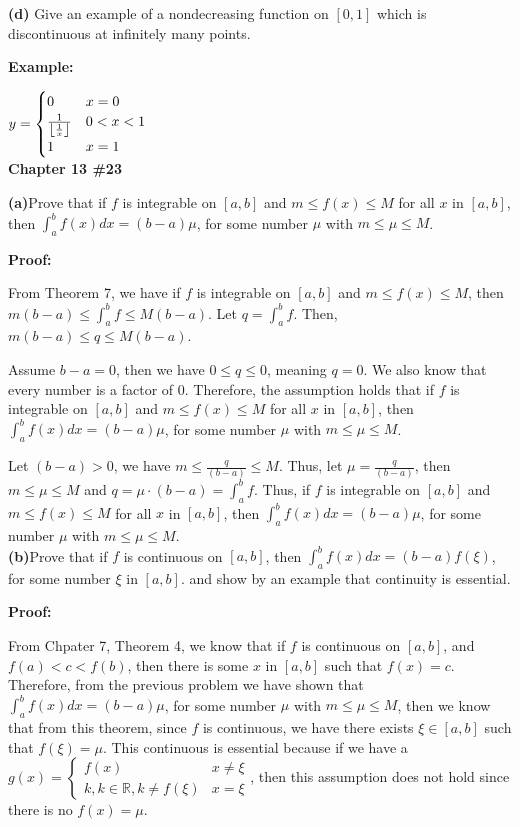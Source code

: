 \documentclass[a4paper,12pt]{report}
\DeclarePairedDelimiter\floor{\lfloor}{\rfloor}
\begin{document}
\noindent
\textbf{(d)} Give an example of a nondecreasing function on $[0,1]$ which is discontinuous at infinitely many points. 

\noindent
\textbf{Example: }

 $y =
    \begin{cases}
      0 & x=0\\
      \frac{1}{\floor*{\frac{1}{x}}} & 0<x<1\\
      1 & x=1
    \end{cases}  $\\
    
\noindent
\textbf{Chapter 13 \#23}

\noindent
\textbf{(a)}Prove that if $f$ is integrable on $[a,b]$ and $m\leq f(x)\leq M$ for all $x$ in $[a,b]$, then $\int_a^bf(x)dx=(b-a)\mu$, for some number $\mu$ with $m\leq \mu\leq M$.

\noindent
\textbf{Proof:}

\noindent
From Theorem 7, we have if $f$ is integrable on $[a,b]$ and $m\leq f(x)\leq M$, then $m(b-a)\leq \int_{a}^{b}f\leq M(b-a)$. Let $q = \int_{a}^{b}f$. Then, $m(b-a)\leq q\leq M(b-a)$. 

\noindent
Assume $b-a=0$, then we have $0\leq q \leq 0$, meaning $q=0$. We also know that every number is a factor of $0$. Therefore, the assumption holds that if $f$ is integrable on $[a,b]$ and $m\leq f(x)\leq M$ for all $x$ in $[a,b]$, then $\int_a^bf(x)dx=(b-a)\mu$, for some number $\mu$ with $m\leq \mu\leq M$.

\noindent
Let $(b-a)>0$, we have $m\leq \frac{q}{(b-a)}\leq M$. Thus, let $\mu = \frac{q}{(b-a)}$, then $m\leq \mu\leq M$ and $q=\mu\cdot{(b-a)}=\int_{a}^{b}f$. Thus, if $f$ is integrable on $[a,b]$ and $m\leq f(x)\leq M$ for all $x$ in $[a,b]$, then $\int_a^bf(x)dx=(b-a)\mu$, for some number $\mu$ with $m\leq \mu\leq M$.\\

\noindent
\textbf{(b)}Prove that if $f$ is continuous on $[a,b]$, then $\int_a^bf(x)dx=(b-a)f(\xi)$, for some number $\xi$ in $[a,b]$. and show by an example that continuity is essential.

\noindent
\textbf{Proof: }

\noindent
From Chpater 7, Theorem 4, we know that if $f$ is continuous on $[a,b]$, and $f(a)<c<f(b)$, then there is some $x$ in $[a,b]$ such that $f(x) = c$. Therefore, from the previous problem we have shown that $\int_a^bf(x)dx=(b-a)\mu$, for some number $\mu$ with $m\leq \mu\leq M$, then we know that from this theorem, since $f$ is continuous, we have there exists $\xi \in [a,b]$ such that $f(\xi )=\mu$.
This continuous is essential because if we have a $g(x)=
\begin{cases}
f(x) & x\neq \xi\\
k, k\in \mathbb{R}, k\neq f(\xi) &x=\xi
\end{cases}$, then this assumption does not hold since there is no $f(x)=\mu$. 
\\
\end{document}
